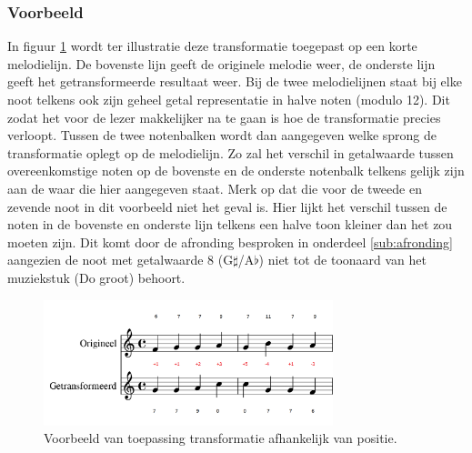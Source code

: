 \subsubsection{Voorbeeld}
In figuur \ref{figuur:voorbeeld_transformatie_1} wordt ter illustratie deze transformatie toegepast op een korte melodielijn. De bovenste lijn geeft de originele melodie weer, de onderste lijn geeft het getransformeerde resultaat weer. Bij de twee melodielijnen staat bij elke noot telkens ook zijn geheel getal representatie in halve noten (modulo 12). Dit zodat het voor de lezer makkelijker na te gaan is hoe de transformatie precies verloopt. Tussen de twee notenbalken wordt dan aangegeven welke sprong de transformatie oplegt op de melodielijn. Zo zal het verschil in getalwaarde tussen overeenkomstige noten op de bovenste en de onderste notenbalk telkens gelijk zijn aan de waar die hier aangegeven staat. Merk op dat die voor de tweede en zevende noot in dit voorbeeld niet het geval is. Hier lijkt het verschil tussen de noten in de bovenste en onderste lijn telkens een halve toon kleiner dan het zou moeten zijn. Dit komt door de afronding besproken in onderdeel \ref{sub:afronding} aangezien de noot met getalwaarde 8 (G$\sharp$/A$\flat$) niet tot de toonaard van het muziekstuk (Do groot) behoort.

\begin{figure}[!ht]
  \centering
  \includegraphics[width=0.75\textwidth]{3_Melodische_Transformatie/transfo1}
  \caption{Voorbeeld van toepassing transformatie afhankelijk van positie.}
  \label{figuur:voorbeeld_transformatie_1}
\end{figure}

